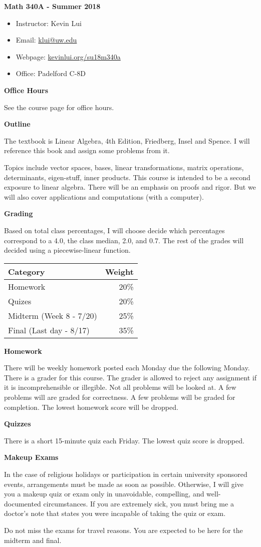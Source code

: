 \documentclass{article}
\begin{document}
\textbf{\huge  Math 340A - Summer 2018}
\begin{itemize}
    \item
        Instructor: Kevin Lui
    \item
        Email: \href{mailto:klui@uw.edu}{klui@uw.edu}
    \item
        Webpage: \url{kevinlui.org/su18m340a}
    \item
        Office: Padelford C-8D
\end{itemize}

\textbf{Office Hours}

See the course page for office hours.

\textbf{Outline}

The textbook is Linear Algebra, 4th Edition, Friedberg, Insel and Spence. I
will reference this book and assign some problems from it.  

Topics include vector spaces, bases, linear transformations, matrix operations,
determinants, eigen-stuff, inner products.  This course is intended to be a
second exposure to linear algebra. There will be an emphasis on proofs and
rigor. But we will also cover applications and computations (with a computer).

\textbf{Grading}

Based on total class percentages, I will choose decide which percentages
correspond to a 4.0, the class median, 2.0, and 0.7. The rest of the grades
will decided using a piecewise-linear function.

\begin{tabular}{ l r }
    Category  & Weight   \\
    \hline
    Homework  & 20\%      \\
    Quizes  & 20\%      \\
    Midterm (Week 8 - 7/20) & 25\%      \\
    Final (Last day - 8/17)    & 35\%
\end{tabular}

\textbf{Homework}

There will be weekly homework posted each Monday due the following Monday.
There is a grader for this course.  The grader is allowed to reject any
assignment if it is incomprehensible or illegible.  Not all problems will be
looked at. A few problems will are graded for correctness. A few problems will
 be graded for completion.  The lowest homework score will be dropped.

\textbf{Quizzes}

There is a short 15-minute quiz each Friday. The lowest quiz score is dropped.

\textbf{Makeup Exams}

In the case of religious holidays or participation in certain university
sponsored events, arrangements must be made as soon as possible. Otherwise, I
will give you a makeup quiz or exam only in unavoidable, compelling, and
well-documented circumstances. If you are extremely sick, you must bring me a
doctor's note that states you were incapable of taking the quiz or exam. 

Do not miss the exams for travel reasons. You are expected to be here for the
midterm and final.
\end{document}

